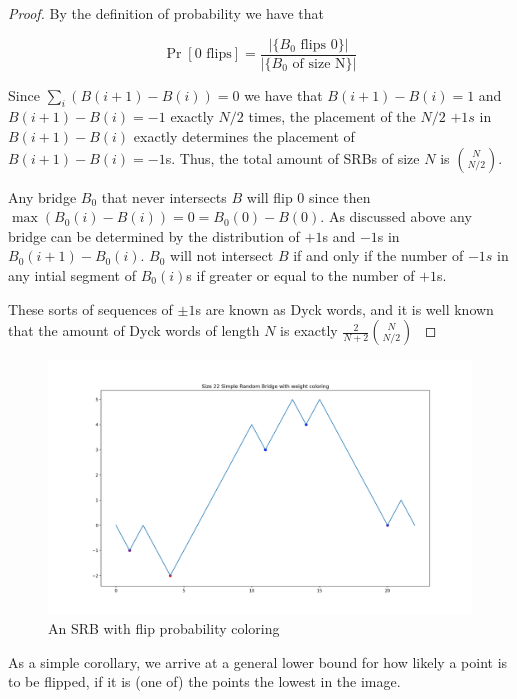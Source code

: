 \documentclass{article}
\theoremstyle{definition}
\begin{document}
\begin{proof} By the definition of probability we have that

$$\Pr[0\,\,\mathrm{flips}]=\frac{|\{B_0 \,\, \mathrm{flips\,\, }0\}|}{|\{B_0\,\,\mathrm{of\,\,size\,\,N}\}|}$$

Since $\sum_i (B(i+1)-B(i))=0$ we have that $B(i+1)-B(i)=1$ and $B(i+1)-B(i)=-1$ exactly $N/2$ times, the placement of the $N/2$ $+1s$ in $B(i+1)-B(i)$ exactly determines the placement of $B(i+1)-B(i)=-1$s. Thus, the total amount of SRBs of size $N$ is ${N \choose N/2}$.

Any bridge $B_0$ that never intersects $B$ will flip $0$ since then $\max(B_0(i)-B(i))=0=B_0(0)-B(0)$. As discussed above any bridge can be determined by the distribution of $+1$s and $-1$s in $B_0(i+1)-B_0(i)$. $B_0$ will not intersect $B$ if and only if the number of $-1s$ in any intial segment of $B_0(i)$s if greater or equal to the number of $+1$s.

These sorts of sequences of $\pm1$s are known as Dyck words, and it is well known that the amount of Dyck words of length $N$ is exactly $\frac{2}{N+2}{N\choose N/2}$ \cite{duchon2000enumeration}
\end{proof}

\begin{figure}[h!]
\caption{An SRB with flip probability coloring}
\centering
\includegraphics[width=\textwidth]{Figure_5}
\end{figure}

As a simple corollary, we arrive at a general lower bound for how likely a point is to be flipped, if it is (one of) the points the lowest in the image.
\end{document}
